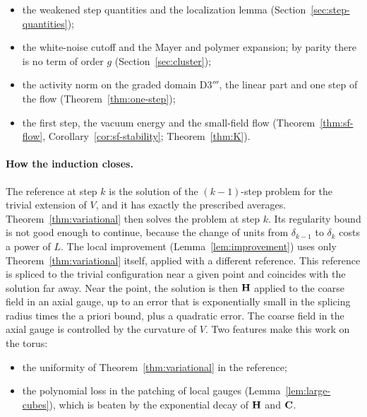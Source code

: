 \begin{itemize}
\begin{itemize}
  \item the weakened step quantities and the localization lemma (Section~\ref{sec:step-quantities});
  \item the white-noise cutoff and the Mayer and polymer expansion; by parity there is no term of order $g$ (Section~\ref{sec:cluster});
  \item the activity norm on the graded domain D3$'''$, the linear part and one step of the flow (Theorem~\ref{thm:one-step});
  \item the first step, the vacuum energy and the small-field flow (Theorem~\ref{thm:sf-flow}, Corollary~\ref{cor:sf-stability}; Theorem~\ref{thm:K}).
  \end{itemize}
\end{itemize}

\paragraph{How the induction closes.} The reference at step $k$ is the solution of the $(k-1)$-step problem for the trivial extension of $V$, and it has exactly the prescribed averages. Theorem~\ref{thm:variational} then solves the problem at step $k$. Its regularity bound is not good enough to continue, because the change of units from $\delta_{k-1}$ to $\delta_k$ costs a power of $L$. The local improvement (Lemma~\ref{lem:improvement}) uses only Theorem~\ref{thm:variational} itself, applied with a different reference. This reference is spliced to the trivial configuration near a given point and coincides with the solution far away. Near the point, the solution is then $\mathbf H$ applied to the coarse field in an axial gauge, up to an error that is exponentially small in the splicing radius times the a priori bound, plus a quadratic error. The coarse field in the axial gauge is controlled by the curvature of $V$. Two features make this work on the torus:
\begin{itemize}
\item the uniformity of Theorem~\ref{thm:variational} in the reference;
\item the polynomial loss in the patching of local gauges (Lemma~\ref{lem:large-cubes}), which is beaten by the exponential decay of $\mathbf H$ and $\mathbf C$.
\end{itemize}

